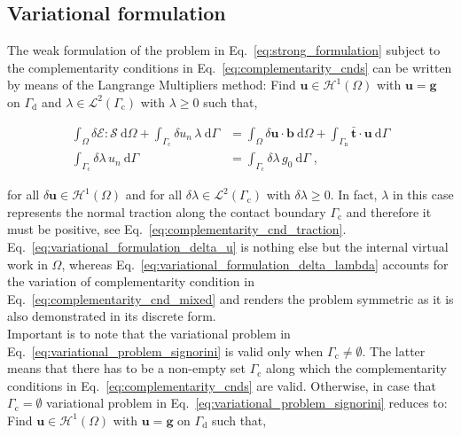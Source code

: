 \documentclass[10pt,a4paper]{article}
\begin{document}
\subsection{Variational formulation}\label{subsec:variational_formulation}

The weak formulation of the problem in Eq.~\eqref{eq:strong_formulation} subject to the complementarity conditions in Eq.~\eqref{eq:complementarity_cnds} can be written by means of the Langrange Multipliers method: Find $\mathbf{u} \in \boldsymbol{\mathcal{H}}^1 (\Omega)$ with $\mathbf{u} = \mathbf{g}$ on $\Gamma_{\text{d}}$ and $\lambda \in \mathcal{L}^2(\Gamma_{\text{c}})$ with $\lambda \ge 0$ such that,

\begin{subequations}
	\begin{alignat}{1}
		\int_{\Omega} \delta \boldsymbol{\mathcal{E}} : \boldsymbol{\mathcal{S}} \: \text{d} \Omega + \int_{\Gamma_{\text{c}}} \delta u_n \, \lambda \: \text{d} \Gamma &= \int_{\Omega} \delta \mathbf{u} \cdot \mathbf{b} \: \text{d} \Omega + \int_{\Gamma_{\text{n}}} \bar{\mathbf{t}} \cdot \mathbf{u} \: \text{d} \Gamma \label{eq:variational_formulation_delta_u} \\
		\int_{\Gamma_{\text{c}}} \delta \lambda \, u_n \: \text{d} \Gamma &= \int_{\Gamma_{\text{c}}} \delta \lambda \, g_0 \: \text{d} \Gamma \;, \label{eq:variational_formulation_delta_lambda}
	\end{alignat}
	\label{eq:variational_problem_signorini}
\end{subequations}

for all $\delta \mathbf{u} \in \boldsymbol{\mathcal{H}}^1 (\Omega)$ and for all $\delta \lambda \in \mathcal{L}^2(\Gamma_{\text{c}})$ with $\delta \lambda \ge 0$. In fact, $\lambda$ in this case represents the normal traction along the contact boundary $\Gamma_{\text{c}}$ and therefore it must be positive, see Eq.~\eqref{eq:complementarity_cnd_traction}. Eq.~\eqref{eq:variational_formulation_delta_u} is nothing else but the internal virtual work in $\Omega$, whereas Eq.~\eqref{eq:variational_formulation_delta_lambda} accounts for the variation of complementarity condition in Eq.~\eqref{eq:complementarity_cnd_mixed} and renders the problem symmetric as it is also demonstrated in its discrete form.\\

Important is to note that the variational problem in Eq.~\eqref{eq:variational_problem_signorini} is valid only when $\Gamma_{\text{c}} \neq \emptyset$. The latter means that there has to be a non-empty set $\Gamma_{\text{c}}$ along which the complementarity conditions in Eq.~\eqref{eq:complementarity_cnds} are valid. Otherwise, in case that $\Gamma_{\text{c}} = \emptyset$ variational problem in Eq.~\eqref{eq:variational_problem_signorini} reduces to: Find $\mathbf{u} \in \boldsymbol{\mathcal{H}}^1 (\Omega)$ with $\mathbf{u} = \mathbf{g}$ on $\Gamma_{\text{d}}$ such that,
\end{document}
